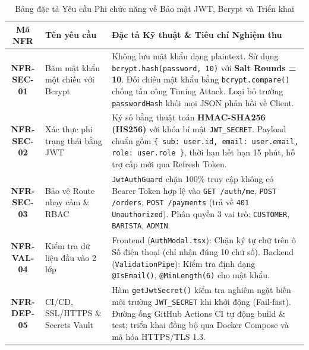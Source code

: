 \documentclass[a4paper]{article}
\begin{document}
\begin{table}[H]
\centering
\small
\begin{tabular}{|c|>{\raggedright\arraybackslash}p{3.2cm}|>{\raggedright\arraybackslash}p{9.8cm}|}
\hline
\textbf{Mã NFR} & \textbf{Tên yêu cầu} & \textbf{Đặc tả Kỹ thuật \& Tiêu chí Nghiệm thu} \\ \hline
\textbf{NFR-SEC-01} & Băm mật khẩu một chiều với Bcrypt & 
Không lưu mật khẩu dạng plaintext. Sử dụng \texttt{bcrypt.hash(password, 10)} với \textbf{Salt Rounds = 10}. Đối chiếu mật khẩu bằng \texttt{bcrypt.compare()} chống tấn công Timing Attack. Loại bỏ trường \texttt{passwordHash} khỏi mọi JSON phản hồi về Client. \\ \hline
\textbf{NFR-SEC-02} & Xác thực phi trạng thái bằng JWT & 
Ký số bằng thuật toán \textbf{HMAC-SHA256 (HS256)} với khóa bí mật \texttt{JWT\_SECRET}. Payload chuẩn gồm \texttt{\{ sub: user.id, email: user.email, role: user.role \}}, thời hạn hết hạn 15 phút, hỗ trợ cấp mới qua Refresh Token. \\ \hline
\textbf{NFR-SEC-03} & Bảo vệ Route nhạy cảm \& RBAC & 
\texttt{JwtAuthGuard} chặn 100\% truy cập không có Bearer Token hợp lệ vào \texttt{GET /auth/me}, \texttt{POST /orders}, \texttt{POST /payments} (trả về \texttt{401 Unauthorized}). Phân quyền 3 vai trò: \texttt{CUSTOMER}, \texttt{BARISTA}, \texttt{ADMIN}. \\ \hline
\textbf{NFR-VAL-04} & Kiểm tra dữ liệu đầu vào 2 lớp & 
Frontend (\texttt{AuthModal.tsx}): Chặn ký tự chữ trên ô Số điện thoại (chỉ nhận đúng 10 chữ số). Backend (\texttt{ValidationPipe}): Kiểm tra định dạng \texttt{@IsEmail()}, \texttt{@MinLength(6)} cho mật khẩu. \\ \hline
\textbf{NFR-DEP-05} & CI/CD, SSL/HTTPS \& Secrets Vault & 
Hàm \texttt{getJwtSecret()} kiểm tra nghiêm ngặt biến môi trường \texttt{JWT\_SECRET} khi khởi động (Fail-fast). Đường ống GitHub Actions CI tự động build \& test; triển khai đồng bộ qua Docker Compose và mã hóa HTTPS/TLS 1.3. \\ \hline
\end{tabular}
\caption{Bảng đặc tả Yêu cầu Phi chức năng về Bảo mật JWT, Bcrypt và Triển khai}
\label{tab:nfr_security}
\end{table}
\end{document}
